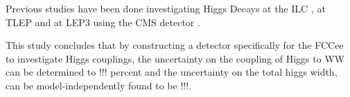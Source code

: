 \documentclass[preprintnumbers,nofootinbib,noshowpacs,eqsecnum,prd,superscriptaddress,letterpaper]{revtex4}
\begin{document}
Previous studies have been done investigating Higgs Decays at the ILC \cite{Higgs ILC}, at TLEP \cite{TLEP} and at LEP3 using the CMS detector \cite{lep3}.

This study concludes that by constructing a detector specifically for the FCCee to investigate Higgs couplings, the uncertainty on the coupling of Higgs to WW can be determined to !!! percent and the uncertainty on the total higgs width, can be model-independently found to be !!!.




\end{document}
